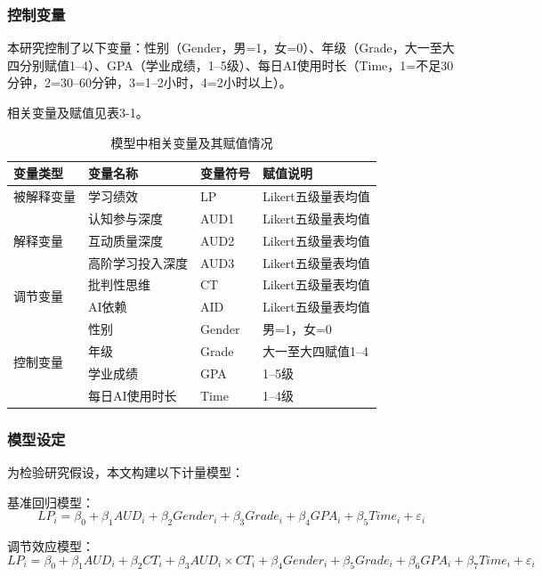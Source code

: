 \documentclass{njtech-thesis}
\begin{document}
\subsubsection{控制变量}

本研究控制了以下变量：性别（Gender，男=1，女=0）、年级（Grade，大一至大四分别赋值1--4）、GPA（学业成绩，1--5级）、每日AI使用时长（Time，1=不足30分钟，2=30--60分钟，3=1--2小时，4=2小时以上）。

相关变量及赋值见表3-1。

\begin{table}[htbp]
  \centering
  \caption{模型中相关变量及其赋值情况}
  \begin{tabular}{llll}
    \toprule
    变量类型 & 变量名称 & 变量符号 & 赋值说明 \\
    \midrule
    被解释变量 & 学习绩效 & LP & Likert五级量表均值 \\
    \multirow{3}{*}{解释变量} & 认知参与深度 & AUD1 & Likert五级量表均值 \\
     & 互动质量深度 & AUD2 & Likert五级量表均值 \\
     & 高阶学习投入深度 & AUD3 & Likert五级量表均值 \\
    \multirow{2}{*}{调节变量} & 批判性思维 & CT & Likert五级量表均值 \\
     & AI依赖 & AID & Likert五级量表均值 \\
    \multirow{4}{*}{控制变量} & 性别 & Gender & 男=1，女=0 \\
     & 年级 & Grade & 大一至大四赋值1--4 \\
     & 学业成绩 & GPA & 1--5级 \\
     & 每日AI使用时长 & Time & 1--4级 \\
    \bottomrule
  \end{tabular}
\end{table}

\subsubsection{模型设定}

为检验研究假设，本文构建以下计量模型：

基准回归模型：
$$LP_i = \beta_0 + \beta_1 AUD_i + \beta_2 Gender_i + \beta_3 Grade_i + \beta_4 GPA_i + \beta_5 Time_i + \varepsilon_i$$

调节效应模型：
$$LP_i = \beta_0 + \beta_1 AUD_i + \beta_2 CT_i + \beta_3 AUD_i \times CT_i + \beta_4 Gender_i + \beta_5 Grade_i + \beta_6 GPA_i + \beta_7 Time_i + \varepsilon_i$$
\end{document}

